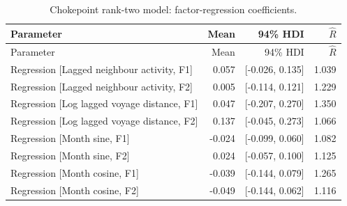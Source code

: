 \documentclass[pdftex,12pt,openright,a4paper,oneside]{book}
\begin{document}
\begin{longtable}{@{}p{}rrr@{}}

\caption{Chokepoint rank-two model: factor-regression coefficients.}\label{tab:chokepoint_rank2_374}\\

\toprule

Parameter & Mean & 94\% HDI & $\widehat R$ \\

\midrule\endfirsthead

\toprule

Parameter & Mean & 94\% HDI & $\widehat R$ \\

\midrule\endhead

Regression [Lagged neighbour activity, F1] & 0.057 & [-0.026, 0.135] & 1.039 \\

Regression [Lagged neighbour activity, F2] & 0.005 & [-0.114, 0.121] & 1.229 \\

Regression [Log lagged voyage distance, F1] & 0.047 & [-0.207, 0.270] & 1.350 \\

Regression [Log lagged voyage distance, F2] & 0.137 & [-0.045, 0.273] & 1.066 \\

Regression [Month sine, F1] & -0.024 & [-0.099, 0.060] & 1.082 \\

Regression [Month sine, F2] & 0.024 & [-0.057, 0.100] & 1.125 \\

Regression [Month cosine, F1] & -0.039 & [-0.144, 0.079] & 1.265 \\

Regression [Month cosine, F2] & -0.049 & [-0.144, 0.062] & 1.116 \\

\bottomrule\end{longtable}
\end{document}
